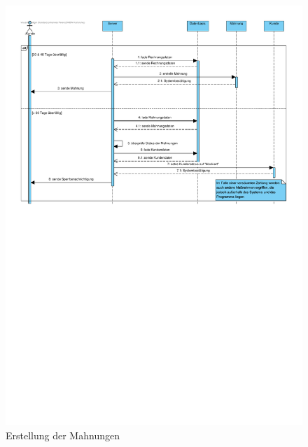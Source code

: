 \begin{figure}[!ht]
    \centering
    \includegraphics[width=\textwidth, trim = 0cm 16cm 0cm 0cm]{Bilder/Diagramme/SD_Buchungsvorgang_04.pdf}
    \caption{Erstellung der Mahnungen}
    \label{img:buchung04}
\end{figure}
